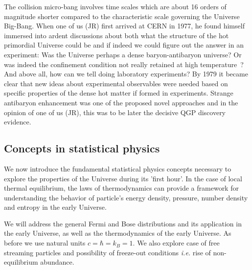 The collision micro-bang involves time scales which are about 16 orders of magnitude shorter compared to the characteristic scale governing the Universe Big-Bang. When one of us (JR) first arrived at CERN in 1977, he found himself immersed into ardent discussions about both what the structure of the hot primordial Universe could be and if indeed we could figure out the answer in an experiment: Was the Universe  perhaps a dense baryon-antibaryon universe? Or was indeed the confinement condition not really retained at high temperature~\cite{Weinberg:1974hy,Harrington:1974fc,Cabibbo:1975ig}? And above all, how can we tell doing laboratory experiments? By 1979 it became clear that new ideas about experimental observables were needed based on specific properties of the dense hot matter if formed in experiments. Strange antibaryon enhancement was one of the proposed novel approaches and in the opinion of one of us (JR), this was to be later the decisive QGP discovery evidence.

\subsection{Concepts in statistical physics} \label{sec:statphys}
We now introduce the fundamental statistical physics concepts necessary to explore the properties of the Universe during its 'first hour'. In the case of local thermal equilibrium, the laws of thermodynamics can provide a framework for understanding the behavior of particle's energy density, pressure, number density and entropy in the early Universe.

We will address the general Fermi and Bose distributions and its application in the early Universe, as well as the thermodynamics of the early Universe. As before we use natural units $c=\hbar=k_{B}=1$. We also explore case of free streaming particles and possibility of freeze-out conditions {\it i.e.\/} rise of non-equilibrium abundance.

